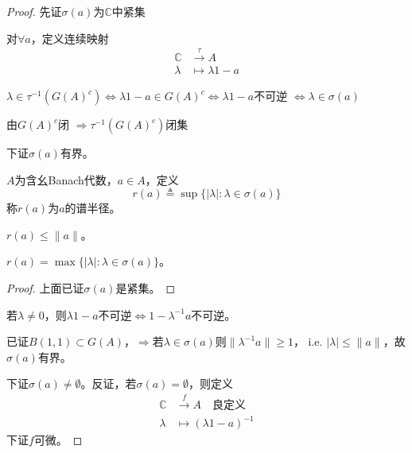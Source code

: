 \documentclass[lang=cn,a4paper,newtx,section]{elegantbook}
\begin{document}
\begin{proof}
  先证$\sigma(a)$为$\mathbb{C}$中紧集
  
  对$\forall a$，定义连续映射
  \begin{equation*}
    \begin{aligned}
      \mathbb{C} &\xrightarrow{\tau} A \\
      \lambda &\longmapsto \lambda 1 - a
    \end{aligned}
  \end{equation*}
  
  $\lambda \in \tau^{-1}(G(A)^c) \Leftrightarrow \lambda 1 - a \in G(A)^c \Leftrightarrow \lambda 1 - a$不可逆
  $\Leftrightarrow \lambda \in \sigma(a)$
  
  由$ G(A)^c$闭 $\Rightarrow \tau^{-1}(G(A)^c)$闭集
  
  下证$\sigma(a)$有界。
  

\begin{definition}[谱半径]
  $A$为含幺Banach代数，$a \in A$，定义
  \begin{equation*}
    r(a) \triangleq \sup\{|\lambda| : \lambda \in \sigma(a)\}
  \end{equation*}
  称$r(a)$为$a$的谱半径。
\end{definition}

\begin{proposition}
  $r(a) \leq \|a\|$。
\end{proposition}

\begin{proposition}
  $r(a) = \max\{|\lambda| : \lambda \in \sigma(a)\}$。
\end{proposition}

\begin{proof}
  上面已证$\sigma(a)$是紧集。
\end{proof}  

  若$\lambda \neq 0$，则$\lambda 1 - a$不可逆$\Longleftrightarrow 1 - \lambda^{-1}a$不可逆。
  
  已证$B(1, 1) \subset G(A)$，$\Rightarrow$若$\lambda \in \sigma(a)$则$\|\lambda^{-1}a\| \geq 1$，
  i.e. $|\lambda| \leq \|a\|$，故$\sigma(a)$有界。
  
  下证$\sigma(a) \neq \emptyset$。反证，若$\sigma(a) = \emptyset$，则定义
  \begin{equation*}
    \begin{aligned}
      \mathbb{C} &\xrightarrow{f} A \quad \text{良定义} \\
      \lambda &\longmapsto (\lambda 1 - a)^{-1}
    \end{aligned}
  \end{equation*}
  下证$f$可微。
  


\end{proof}
\end{document}
